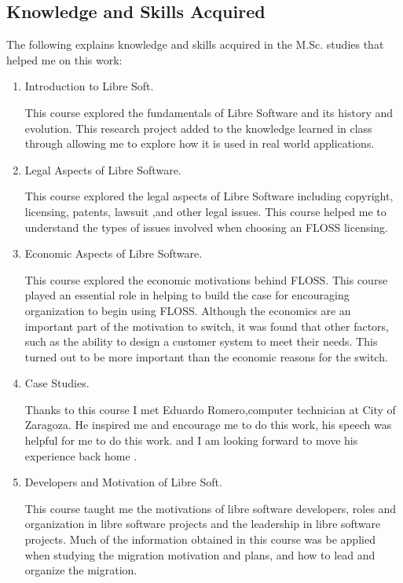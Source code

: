 \subsection{Knowledge and Skills Acquired }
The following explains knowledge and skills acquired in the M.Sc. studies that helped me on
this work:
	\begin{enumerate}
	
\item Introduction to Libre Soft.

 This course explored the fundamentals of Libre Software and its history and evolution. This research project added to the knowledge learned in class through allowing me to explore how it is used in real world applications.

\item Legal Aspects of Libre Software. 

This course explored the legal aspects of Libre Software including copyright, licensing, patents, lawsuit ,and other legal issues. This course helped me to understand the types of issues involved when choosing an FLOSS licensing. 

\item Economic Aspects of Libre Software.

 This course explored the economic motivations behind FLOSS. This course played an essential role in helping to build the case for encouraging organization to begin using FLOSS. Although the economics are an important part of the motivation to switch, it was found that other factors, such as the ability to design a customer system to meet their needs. This turned out to be more important than the economic reasons for the switch. 
 
\item  Case Studies.

Thanks to this course I met Eduardo Romero,computer technician at City of Zaragoza. He inspired me and encourage me to do this work, his speech was helpful for me to do this work. and I am looking forward to move his experience back home .
                 
   \item Developers and Motivation of Libre Soft.
                 
 This course taught me the motivations of libre software developers, roles and organization in libre software projects and the leadership in libre software projects. Much of the information obtained in this course was be applied when studying the migration motivation and plans, and how to lead and organize the migration.
 

\end{enumerate}
